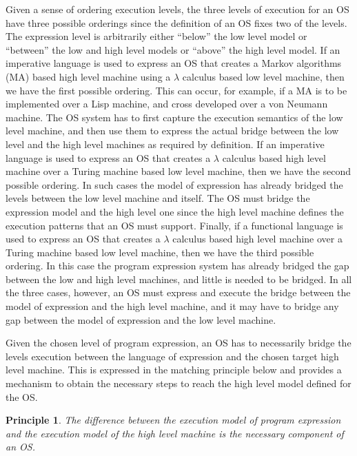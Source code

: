 \documentclass[draft]{article}
\newcounter{theprin}
\newtheorem{principle}[theprin]{Principle}
\begin{document}
Given  a sense  of  ordering  execution levels,  the  three levels  of
execution for an OS have three possible orderings since the definition
of an OS fixes two of the levels.  The expression level is arbitrarily
either ``below'' the  low level model or ``between''  the low and high
level  models or  ``above'' the  high level  model.  If  an imperative
language is  used to  express an OS  that creates a  Markov algorithms
(MA) based  high level  machine using a  $\lambda$ calculus  based low
level machine,  then we  have the first  possible ordering.   This can
occur, for example, if a MA  is to be implemented over a Lisp machine,
and cross developed over a von  Neumann machine.  The OS system has to
first capture  the execution semantics  of the low level  machine, and
then use them  to express the actual bridge between  the low level and
the high level  machines as required by definition.   If an imperative
language is  used to express an  OS that creates  a $\lambda$ calculus
based  high  level machine  over  a  Turing  machine based  low  level
machine, then we have the second possible ordering.  In such cases the
model of  expression has  already bridged the  levels between  the low
level machine and itself.  The OS must bridge the expression model and
the high level one since  the high level machine defines the execution
patterns that an  OS must support.  Finally, if  a functional language
is used to express an OS  that creates a $\lambda$ calculus based high
level machine over  a Turing machine based low  level machine, then we
have the third possible ordering.  In this case the program expression
system  has already bridged  the gap  between the  low and  high level
machines, and little is needed to be bridged.  In all the three cases,
however, an OS  must express and execute the  bridge between the model
of expression  and the high level  machine, and it may  have to bridge
any gap between the model of expression and the low level machine.

Given the chosen level of program expression, an OS has to necessarily
bridge the levels execution between the language of expression and the
chosen target high  level machine.  This is expressed  in the matching
principle below and provides a mechanism to obtain the necessary steps
to reach the high level model defined for the OS.
\begin{principle}
  \label{matching:principle}
  The difference between the execution model of program expression and
  the  execution model  of the  high  level machine  is the  necessary
  component of an OS.
\end{principle}
\end{document}
